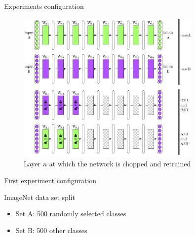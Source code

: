 \documentclass[xcolor=pdftex,dvipsnames,table,mathserif]{beamer}
\begin{document}
\begin{frame}{Experiments configuration}

  \begin{figure}[ht]
    \centering
    \includegraphics[width=0.8\textwidth]{transfer_learning_exp}\\
    \scriptsize{Layer $n$ at which the network is chopped and retrained}
  \end{figure}

\end{frame}


\begin{frame}{First experiment configuration}

  \begin{block}{ImageNet data set split}
    \begin{itemize}
    \item Set A: 500 randomly selected classes
    \item Set B: 500 other classes
    \end{itemize}
  \end{block}

\end{frame}
\end{document}
